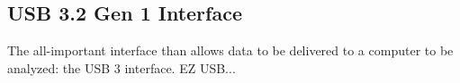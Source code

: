 \subsection{USB 3.2 Gen 1 Interface}
	The all-important interface than allows data to be delivered to a computer to be analyzed: the USB 3 interface. EZ USB...